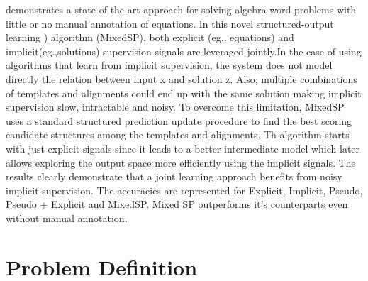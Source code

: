 \documentclass[11pt,letterpaper]{article}
\begin{document}
\cite{UpChChYi16} demonstrates a state of the art approach for solving algebra word problems with little or no manual annotation of equations. In this novel structured-output learning ) algorithm (MixedSP), both explicit (eg., equations) and implicit(eg.,solutions) supervision signals are leveraged jointly.In the case of using algorithms that learn from implicit supervision, the system does not model directly the relation between input x and solution z. Also, multiple combinations of templates and alignments could end up with the same solution making implicit supervision slow, intractable and noisy. To overcome this limitation, MixedSP uses a standard structured prediction update procedure to find the best scoring candidate structures among the templates and alignments. Th algorithm starts with just explicit signals since it leads to a better intermediate model which later allows exploring the output space more efficiently using the implicit signals. The results clearly demonstrate that a joint learning approach benefits from noisy implicit supervision. The accuracies are represented for Explicit, Implicit, Pseudo, Pseudo + Explicit and MixedSP. Mixed SP outperforms it's counterparts even without manual annotation.



\section{Problem Definition}
\end{document}
